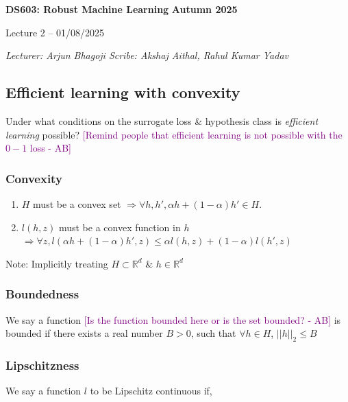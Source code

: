 \documentclass[11pt]{article}
\newcommand{\ab}[1]{\textcolor{purple}{[#1 - AB]}}
\theoremstyle{plain}
\begin{document}
\thispagestyle{plain}

\begin{tcolorbox}[colback=white, colframe=black, boxrule=1pt, sharp corners]
\textbf{DS603: Robust Machine Learning} \hfill \textbf{Autumn 2025}
\begin{center}
\vspace{2mm}
Lecture 2 -- 01/08/2025
\end{center}
\vspace{2mm}
\noindent\textit{Lecturer: Arjun Bhagoji \hfill Scribe: Akshaj Aithal, Rahul Kumar Yadav}
\end{tcolorbox}

\subsection{Efficient learning with convexity}

Under what conditions on the surrogate loss \& hypothesis class is
\textit{efficient learning} possible? \ab{Remind people that efficient learning
is not possible with the $0-1$ loss}

\subsubsection{Convexity}\label{sec:Convexity}
\begin{enumerate}
  \item $H$ must be a convex set $\Rightarrow \forall h, h',\alpha h + (1-\alpha)h' \in H$. 
  \item $l(h,z)$ must be a convex function in $h$ $\Rightarrow \forall z, l(\alpha h+(1-\alpha)h',z) \leq \alpha l(h,z) + (1-\alpha)l(h',z)$
\end{enumerate}

\small{Note: Implicitly treating $H\subset\mathbb{R}^d$ \& $h\in \mathbb{R}^d$}

\subsubsection{Boundedness}\label{sec:Boundedness}
We say a function \ab{Is the function bounded here or is the set bounded?} is bounded if there exists a real number $B > 0$, such that 
$\forall h \in H$, $\lvert\lvert h \rvert\rvert_2 \leq B$

\subsubsection{Lipschitzness}\label{sec:Lipschitzness}
We say a function $l$ to be Lipschitz continuous if, 
\end{document}
